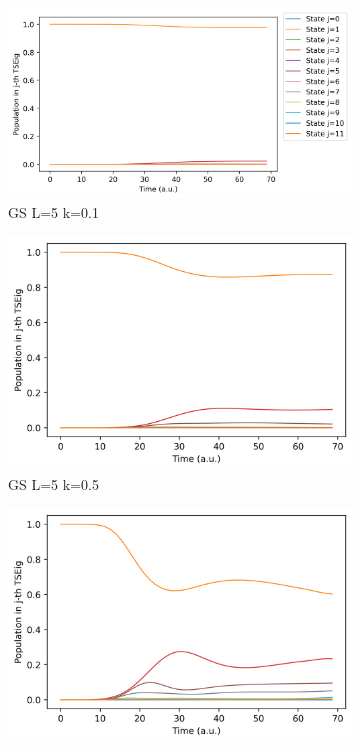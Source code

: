 \documentclass[11pt, a4paper]{article} %
\begin{document}
\begin{figure}[p]
  \centering
  \begin{subfigure}[b]{0.36\linewidth}
    \includegraphics[width=\linewidth]{Population_GS_L5_k0_0.1.png}
    \caption{GS L=5 k=0.1}
  \end{subfigure}
    \begin{subfigure}[b]{0.30\linewidth}
    \includegraphics[width=\linewidth]{Population_GS_L5_k0_0.5.png}
    \caption{GS L=5 k=0.5}
  \end{subfigure}  
  \begin{subfigure}[b]{0.30\linewidth}
    \includegraphics[width=\linewidth]{Population_GS_L5_k0_1.0.png}

\end{subfigure}
\end{figure}
\end{document}
